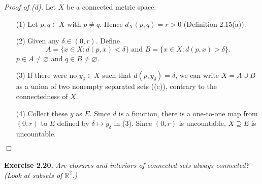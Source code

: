 \documentclass{article}
\begin{document}
\emph{Proof of (d).}
Let $X$ be a connected metric space.
\begin{enumerate}
\item[(1)]
Let $p, q \in X$ with $p \neq q$.
Hence $d_X(p,q) = r > 0$ (Definition 2.15(a)).
\item[(2)]
Given any $\delta \in (0, r)$.
Define
$$A = \{ x \in X : d(p,x) < \delta \} \text{ and } B = \{ x \in X : d(p,x) > \delta \}.$$
$p \in A \neq \varnothing$ and $q \in B \neq \varnothing$.
\item[(3)]
If there were no $y_{\delta} \in X$ such that $d(p,y_{\delta}) = \delta$,
we can write $X = A \cup B$ as a union of two nonempty separated sets ((c)),
contrary to the connectedness of $X$.
\item[(4)]
Collect these $y$ as $E$.
Since $d$ is a function, there is a one-to-one map from $(0,r)$ to $E$
defined by $\delta \mapsto y_{\delta}$ in (3).
Since $(0,r)$ is uncountable, $X \supseteq E$ is uncountable.
\end{enumerate}
$\Box$ \\\\






\textbf{Exercise 2.20.}
\emph{Are closures and interiors of connected sets always connected?
(Look at subsets of $\mathbb{R}^2$.)} \\
\end{document}
